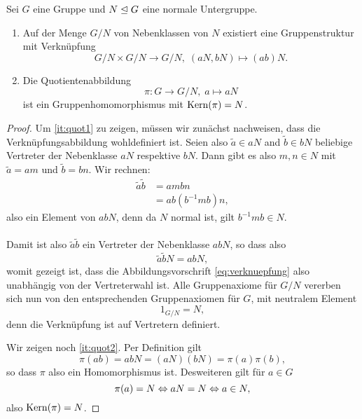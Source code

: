 \documentclass{book}
\begin{document}
\begin{prop}
    \label{prop:quotientengruppe}
    Sei $G$ eine Gruppe und $N \trianglelefteq G$ eine normale Untergruppe. 
    \begin{enumerate}
        \item\label{it:quot1} Auf der Menge $G/N$ von Nebenklassen von $N$ existiert eine Gruppenstruktur mit Verknüpfung
            \begin{equation}\label{eq:verknuepfung}
                G/N \times G/N \to G/N, \; (aN,bN) \mapsto (ab)N.
            \end{equation}
        \item\label{it:quot2} Die Quotientenabbildung
            \[
                \pi: G \to G/N,\; a \mapsto aN
            \]
            ist ein Gruppenhomomorphismus mit $\operatorname{Kern}(\pi) = N$. 
    \end{enumerate}
\end{prop}
\begin{proof}
    Um \ref{it:quot1} zu zeigen, müssen wir zunächst nachweisen, dass die
    Verknüpfungsabbildung wohldefiniert ist. Seien also $\tilde{a} \in aN$ and
    $\tilde{b} \in bN$ beliebige Vertreter der Nebenklasse $aN$ respektive
    $bN$. Dann gibt es also $m,n \in N$ mit $\tilde{a} = am$ und $\tilde{b} = bn$. Wir rechnen:
    \begin{align*}
        \tilde{a} \tilde{b} & = am bn\\
                            & = ab (b^{-1} m b) n,
    \end{align*}
    also ein Element von $ab N$, denn da $N$ normal ist, gilt $b^{-1} m b \in
    N$. 
    \\ \\
    Damit ist also $\tilde{a} \tilde{b}$ ein Vertreter der Nebenklasse $ab
    N$, so dass also 
    \[
        \tilde{a} \tilde{b} N = ab N,
    \]
    womit gezeigt ist, dass die Abbildungsvorschrift \eqref{eq:verknuepfung}
    also unabhängig von der Vertreterwahl ist. Alle Gruppenaxiome für $G/N$
    vererben sich nun von den entsprechenden Gruppenaxiomen für $G$, mit neutralem Element
    \[
        1_{G/N} = N,
    \]
    denn die Verknüpfung ist auf Vertretern definiert. 

    Wir zeigen noch \ref{it:quot2}. Per Definition gilt
    \[
        \pi(ab) = ab N = (aN)(bN) = \pi(a) \pi(b),
    \]
    so dass $\pi$ also ein Homomorphismus ist. Desweiteren gilt für $a \in G$
    \[
        \pi(a) = N \Leftrightarrow a N = N \Leftrightarrow a \in N,
    \]
    also $\operatorname{Kern}(\pi) = N$. 
\end{proof}
\end{document}
